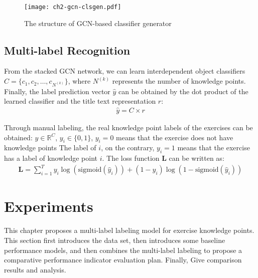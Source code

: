 \begin{figure}[H]
	\centering
	\texttt{[image: ch2-gcn-clsgen.pdf]}
	\caption{The structure of GCN-based classifier generator}\label{fig:ch2-gcn-clsgen}
\end{figure}

\subsection{Multi-label Recognition}

From the stacked GCN network, we can learn interdependent object classifiers \(C=\{c_1,c_2,\ldots,c_{N^{(k)}}\} \), where \(N^{(k)}\) represents the number of knowledge points. Finally, the label prediction vector \(\hat{y}\) can be obtained by the dot product of the learned classifier and the title text representation \(r\):
\begin{align}
	\hat{y} = C\times r
\end{align}

Through manual labeling, the real knowledge point labels of the exercises can be obtained: \(y\in \mathbb{R}^C\), \(y_i\in \{0,1\} \), \(y_i=0\) means that the exercise does not have knowledge points The label of \(i\), on the contrary, \(y_i=1\) means that the exercise has a label of knowledge point \(i\). The loss function \(\mathbf{L}\) can be written as:
\begin{align}
	\mathbf{L}=\sum_{i=1}^{T} y_i \log (\text{sigmoid}(\hat{y}_i))+(1-y_i) \log (1-\text{sigmoid}(\hat{y}_i))
\end{align}

\section{Experiments}
This chapter proposes a multi-label labeling model for exercise knowledge points. This section first introduces the data set, then introduces some baseline performance models, and then combines the multi-label labeling to propose a comparative performance indicator evaluation plan. Finally, Give comparison results and analysis.
